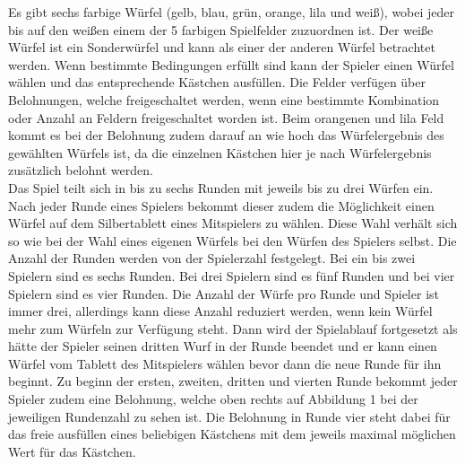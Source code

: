 Es gibt sechs farbige Würfel (gelb, blau, grün, orange, lila und weiß), wobei jeder bis auf den weißen einem der 5 farbigen Spielfelder zuzuordnen ist. Der weiße Würfel ist ein Sonderwürfel und kann als einer der anderen Würfel betrachtet werden. Wenn bestimmte Bedingungen erfüllt sind kann der Spieler einen Würfel wählen und das entsprechende Kästchen ausfüllen. Die Felder verfügen über Belohnungen, welche freigeschaltet werden, wenn eine bestimmte Kombination oder Anzahl an Feldern freigeschaltet worden ist. Beim orangenen und lila Feld kommt es bei der Belohnung zudem darauf an wie hoch das Würfelergebnis des gewählten Würfels ist, da die einzelnen Kästchen hier je nach Würfelergebnis zusätzlich belohnt werden.
\\
Das Spiel teilt sich in bis zu sechs Runden mit jeweils bis zu drei Würfen ein. Nach jeder Runde eines Spielers bekommt dieser zudem die Möglichkeit einen Würfel auf dem Silbertablett eines Mitspielers zu wählen. Diese Wahl verhält sich so wie bei der Wahl eines eigenen Würfels bei den Würfen des Spielers selbst. Die Anzahl der Runden werden von der Spielerzahl festgelegt. Bei ein bis zwei Spielern sind es sechs Runden. Bei drei Spielern sind es fünf Runden und bei vier Spielern sind es vier Runden. Die Anzahl der Würfe pro Runde und Spieler ist immer drei, allerdings kann diese Anzahl reduziert werden, wenn kein Würfel mehr zum Würfeln zur Verfügung steht. Dann wird der Spielablauf fortgesetzt als hätte der Spieler seinen dritten Wurf in der Runde beendet und er kann einen Würfel vom Tablett des Mitspielers wählen bevor dann die neue Runde für ihn beginnt. Zu beginn der ersten, zweiten, dritten und vierten Runde bekommt jeder Spieler zudem eine Belohnung, welche oben rechts auf Abbildung 1 bei der jeweiligen Rundenzahl zu sehen ist. Die Belohnung in Runde vier steht dabei für das freie ausfüllen eines beliebigen Kästchens mit dem jeweils maximal möglichen Wert für das Kästchen.

